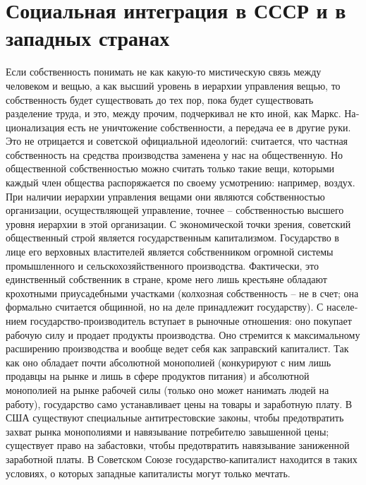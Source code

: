 \documentclass{book}
\begin{document}
\section{Социальная интеграция в СССР и в западных странах}

Если собственность понимать не как какую-то мистическую связь между человеком и вещью, а как высший уровень в ие­рархии управления вещью, то собственность будет существо­вать до тех пор, пока будет существовать разделение труда, и это, между прочим, подчеркивал не кто иной, как Маркс. На­ционализация есть не уничтожение собственности, а передача ее в другие руки. Это не отрицается и советской официальной идеологий: считается, что частная собственность  на средства производства заменена у нас на общественную.  Но общественной собственностью можно считать только такие вещи, кото­рыми каждый член общества распоряжается по своему усмот­рению: например, воздух. При наличии иерархии управления вещами они являются собственностью организации, осущест­вляющей управление, точнее -- собственностью высшего уров­ня иерархии в этой организации. С экономической точки зре­ния, советский общественный строй является государственным капитализмом. Государство в лице его верховных властите­лей является собственником огромной 
системы промышлен­ного и сельскохозяйственного производства. Фактически, это единственный собственник в стране, кроме него лишь кре­стьяне обладают крохотными приусадебными участками (кол­хозная собственность -- не в счет; она формально считается общинной, но на деле принадлежит государству). С населе­нием государство-производитель вступает в рыночные отно­шения: оно покупает рабочую силу и продает продукты произ­водства. Оно стремится к максимальному расширению произ­водства и вообще ведет себя как заправский капиталист. Так как оно обладает почти абсолютной монополией (конкурируют с ним лишь продавцы на рынке и лишь в сфере продуктов пи­тания) и абсолютной монополией на рынке рабочей силы (толь­ко оно может нанимать людей на работу), государство само устанавливает цены на товары и заработную плату. В США су­ществуют специальные антитрестовские законы, чтобы предот­вратить захват рынка монополиями и навязывание потребите­лю завышенной цены; существует право на забастовки, чтобы предотвратить навязывание 
заниженной заработной платы. В Советском Союзе государство-капиталист находится в таких условиях, о которых западные капиталисты могут только мечтать.
\end{document}

